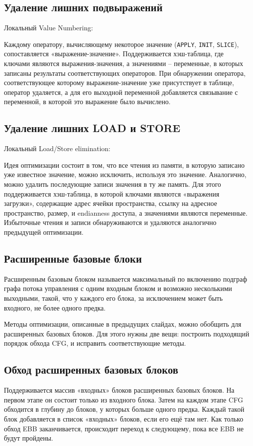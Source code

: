 \documentclass[11pt]{article}
\begin{document}
\subsection{Удаление лишних подвыражений}
\label{sec:org00b83f8}
Локальный Value Numbering:

Каждому оператору, вычисляющему некоторое значение (\texttt{APPLY}, \texttt{INIT}, \texttt{SLICE}), сопоставляется «выражение-значение». Поддерживается хэш-таблица, где ключами являются выражения-значения, а значениями -- переменные, в которых записаны результаты соответствующих операторов. При обнаружении оператора, соответствующее которому выражение-значение уже присутствует в таблице, оператор удаляется, а для его выходной переменной добавляется связывание с переменной, в которой это выражение было вычислено.
\subsection{Удаление лишних LOAD и STORE}
\label{sec:orgd45e06e}
Локальный Load/Store elimination:

Идея оптимизации состоит в том, что все чтения из памяти, в которую записано уже известное значение, можно исключить, используя это значение. Аналогично, можно удалить последующие записи значения в ту же память. Для этого поддерживается хэш-таблица, в которой ключами являются «выражения загрузки», содержащие адрес ячейки пространства, ссылку на адресное пространство, размер, и endianness доступа, а значениями являются переменные. Избыточные чтения и записи обнаруживаются и удаляются аналогично предыдущей оптимизации.
\subsection{Расширенные базовые блоки}
\label{sec:orgfc90214}
Расширенным базовым блоком называется максимальный по включению подграф графа потока управления с одним входным блоком и возможно несколькими выходными, такой, что у каждого его блока, за исключением может быть входного, не более одного предка.

Методы оптимизации, описанные в предыдущих слайдах, можно обобщить для расширенных базовых блоков. Для этого нужны две вещи: построить подходящий порядок обхода CFG, и исправить соответствующие методы.
\subsection{Обход расширенных базовых блоков}
\label{sec:org910cdfe}
Поддерживается массив «входных» блоков расширенных базовых блоков. На первом этапе он состоит только из входного блока. Затем на каждом этапе CFG обходится в глубину до блоков, у которых больше одного предка. Каждый такой блок добавляется в список «входных» блоков, если его ещё там нет. Как только обход EBB заканчивается, происходит переход к следующему, пока все EBB не будут пройдены.
\end{document}
